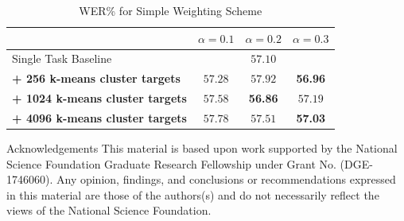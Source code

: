 \documentclass[final]{beamer} %
\begin{document}
\begin{frame}
\begin{columns}
\begin{column}{0.23\textwidth}
{        \vfill
        
        
        \begin{table}[!htbp]
          \centering
          \caption{WER\% for Simple Weighting Scheme}
          \begin{adjustbox}{width=\textwidth}
            \begin{tabular}{lccc}
              \toprule
              & $\alpha = 0.1 $ & $\alpha = 0.2 $ & $\alpha = 0.3 $\\
              \midrule
              Single Task Baseline  &  \multicolumn{3}{c}{$57.10 $ \raisebox{.33\height}{\footnotesize{$\pm 3.25$}}}     \\
              \textbf{+ 256 k-means cluster targets}  &  $57.28 $ \raisebox{.33\height}{\footnotesize{$\pm 2.09$}}   &  $57.92 $ \raisebox{.33\height}{\footnotesize{$\pm 1.78$}}     & \textbf{56.96} \raisebox{.33\height}{\footnotesize{$\pm  .70$}} \\
              \textbf{+ 1024 k-means cluster targets}   & $ 57.58$ \raisebox{.33\height}{\footnotesize{$\pm 2.68$}}    & \textbf{ 56.86} \raisebox{.33\height}{\footnotesize{$\pm 1.11$}}    & $57.19  $ \raisebox{.33\height}{\footnotesize{$\pm 1.31$}}  \\
              \textbf{+ 4096 k-means cluster targets}   &  $57.78 $ \raisebox{.33\height}{\footnotesize{$\pm 2.36$}}  & $ 57.51$ \raisebox{.33\height}{\footnotesize{$\pm  2.65$}}   &  \textbf{57.03} \raisebox{.33\height}{\footnotesize{$\pm 1.48$}}  \\
              \bottomrule
            \end{tabular}
          \end{adjustbox}
        \end{table}
        
        \vfill
        
        \begin{block}{\boxnumber Acknowledgements}
          \footnotesize{This material is based upon work supported by the National Science Foundation Graduate Research Fellowship under Grant No. (DGE-1746060). Any opinion, findings, and conclusions or recommendations expressed in this material are those of the authors(s) and do not necessarily reflect the views of the National Science Foundation.}
        \end{block}

        \vfill
        
        }%
    \end{column}
    
  \end{columns}
\end{frame}
\end{document}
